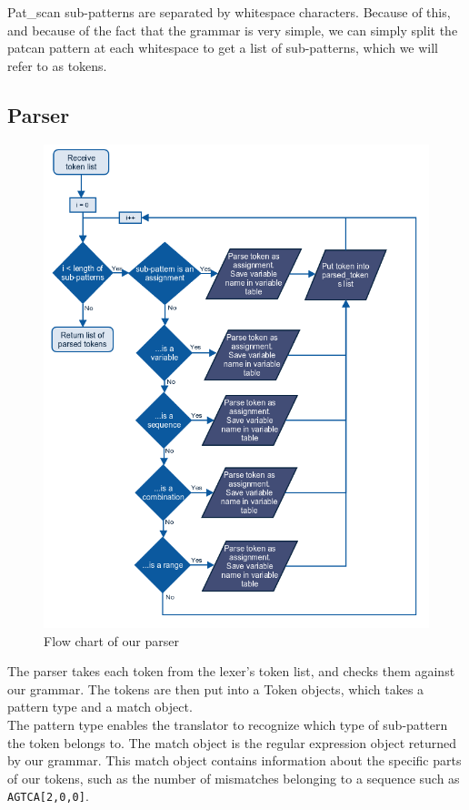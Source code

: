 \documentclass[12pt]{article}
\begin{document}
Pat\_scan sub-patterns are separated by whitespace characters. Because of this, and because of the fact that the grammar is very simple, we can simply split the patcan pattern at each whitespace to get a list of sub-patterns, which we will refer to as tokens.

\subsection{Parser}
\begin{figure}[H]
	\begin{center}
		\includegraphics[scale=0.65]{parser.png}
	\end{center}	
	\caption{Flow chart of our parser}
\end{figure}

The parser takes each token from the lexer's token list, and checks them against our grammar. The tokens are then put into a Token objects, which takes a pattern type and a match object. \\
The pattern type enables the translator to recognize which type of sub-pattern the token belongs to. The match object is the regular expression object returned by our grammar. This match object contains information about the specific parts of our tokens, such as the number of mismatches belonging to a sequence such as \texttt{AGTCA[2,0,0]}.
\end{document}
